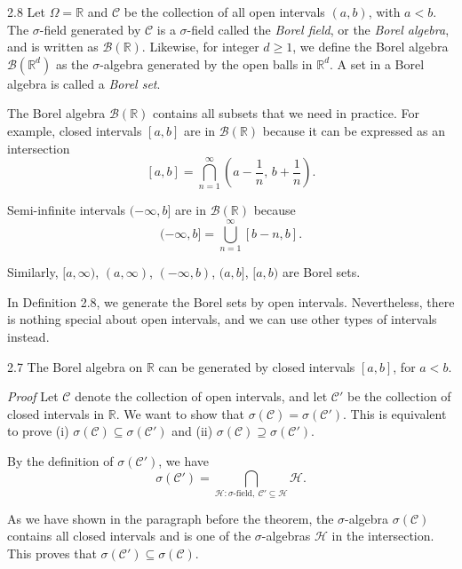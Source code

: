 \begin{defbox}{2.8}
Let $\Omega=\mathbb{R}$ and $\mathcal{C}$ be the collection of all open intervals $(a,b)$, with $a<b$. The $\sigma$-field generated by $\mathcal{C}$ is a $\sigma$-field called the \textit{Borel field}, or the \textit{Borel algebra}, and is written as $\mathcal{B}(\mathbb{R})$. Likewise, for integer $d\ge 1$, we define the Borel algebra $\mathcal{B}(\mathbb{R}^d)$ as the $\sigma$-algebra generated by the open balls in $\mathbb{R}^d$. A set in a Borel algebra is called a \textit{Borel set}.

The Borel algebra $\mathcal{B}(\mathbb{R})$ contains all subsets that we need in practice. For example, closed intervals $[a,b]$ are in $\mathcal{B}(\mathbb{R})$ because it can be expressed as an intersection
\[
[a,b]=\bigcap_{n=1}^{\infty} \left(a-\frac{1}{n},\, b+\frac{1}{n}\right).
\]

Semi-infinite intervals $(-\infty,b]$ are in $\mathcal{B}(\mathbb{R})$ because
\[
(-\infty,b]=\bigcup_{n=1}^{\infty} [b-n,b].
\]

Similarly, $[a,\infty)$, $(a,\infty)$, $(-\infty,b)$, $(a,b]$, $[a,b)$ are Borel sets.
\end{defbox}

In Definition 2.8, we generate the Borel sets by open intervals. Nevertheless, there is nothing special about open intervals, and we can use other types of intervals instead.

\begin{thmbox}{2.7}
The Borel algebra on $\mathbb{R}$ can be generated by closed intervals $[a,b]$, for $a<b$.
\end{thmbox}

\textit{Proof} Let $\mathcal{C}$ denote the collection of open intervals, and let $\mathcal{C}'$ be the collection of closed intervals in $\mathbb{R}$. We want to show that $\sigma(\mathcal{C})=\sigma(\mathcal{C}')$. This is equivalent to prove (i) $\sigma(\mathcal{C})\subseteq \sigma(\mathcal{C}')$ and (ii) $\sigma(\mathcal{C})\supseteq \sigma(\mathcal{C}')$.

By the definition of $\sigma(\mathcal{C}')$, we have
\[
\sigma(\mathcal{C}')
=
\bigcap_{\mathcal{H}:\sigma\text{-field},\ \mathcal{C}'\subseteq \mathcal{H}} \mathcal{H}.
\]

As we have shown in the paragraph before the theorem, the $\sigma$-algebra $\sigma(\mathcal{C})$ contains all closed intervals and is one of the $\sigma$-algebras $\mathcal{H}$ in the intersection. This proves that $\sigma(\mathcal{C}')\subseteq \sigma(\mathcal{C})$.

